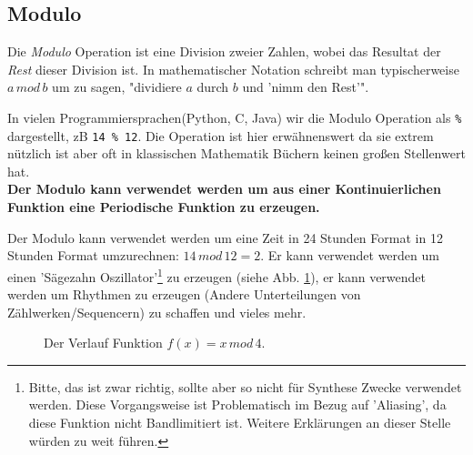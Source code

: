 

\subsection{Modulo}

Die \emph{Modulo} Operation ist eine Division zweier Zahlen, wobei das Resultat der \emph{Rest} dieser Division ist. In mathematischer Notation schreibt man typischerweise $a \, mod \, b$ um zu sagen, "dividiere $a$ durch $b$ und 'nimm den Rest'".

In vielen Programmiersprachen(Python, C, Java) wir die Modulo Operation als \texttt{\%} dargestellt, zB \texttt{14 \% 12}. Die Operation ist hier erwähnenswert da sie extrem nützlich ist aber oft in klassischen Mathematik Büchern keinen großen Stellenwert hat. \\
\textbf{Der Modulo kann verwendet werden um aus einer Kontinuierlichen Funktion eine Periodische Funktion zu erzeugen.}

Der Modulo kann verwendet werden um eine Zeit in 24 Stunden Format in 12 Stunden Format umzurechnen: $14 \, mod \, 12 = 2$. Er kann verwendet werden um einen 'Sägezahn Oszillator'\footnote{Bitte, das ist zwar richtig, sollte aber so nicht für Synthese Zwecke verwendet werden. Diese Vorgangsweise ist Problematisch im Bezug auf 'Aliasing', da diese Funktion nicht Bandlimitiert ist. Weitere Erklärungen an dieser Stelle würden zu weit führen.} zu erzeugen (siehe Abb. \ref{fig:modulo}), er kann verwendet werden um Rhythmen zu erzeugen (Andere Unterteilungen von Zählwerken/Sequencern) zu schaffen und vieles mehr.



\begin{figure}[H]
    \centering
    
    \caption{Der Verlauf Funktion $f(x) =  x \, mod \, 4$.}
    \label{fig:modulo}
\end{figure}





